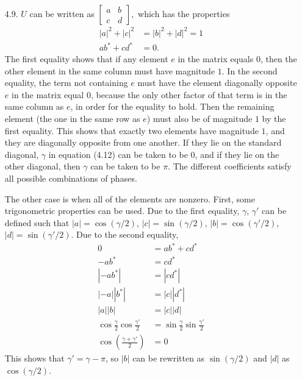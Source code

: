 \documentclass[a4paper,12pt]{article}
\begin{document}
\begin{enumerate}
    \item[4.9.] $U$ can be written as
        $\left[ \begin{array}{cc}
                a & b \\
                c & d
        \end{array} \right],$
        which has the properties
        \begin{align*}
            |a|^2 + |c|^2 &= |b|^2 + |d|^2 = 1 \\
            ab^* + cd^* &= 0.
        \end{align*}
        The first equality shows that if any element $e$ in the matrix equals $0$, then the other element in the same column must have magnitude $1$. In the second equality, the term not containing $e$ must have the element diagonally opposite $e$ in the matrix equal $0$, because the only other factor of that term is in the same column as $e$, in order for the equality to hold. Then the remaining element (the one in the same row as $e$) must also be of magnitude $1$ by the first equality. This shows that exactly two elements have magnitude $1$, and they are diagonally opposite from one another. If they lie on the standard diagonal, $\gamma$ in equation (4.12) can be taken to be $0$, and if they lie on the other diagonal, then $\gamma$ can be taken to be $\pi$. The different coefficients satisfy all possible combinations of phases. \par
        The other case is when all of the elements are nonzero. First, some trigonometric properties can be used. Due to the first equality, $\gamma$, $\gamma'$ can be defined such that $|a| = \cos(\gamma / 2)$, $|c| = \sin(\gamma / 2)$, $|b| = \cos(\gamma' / 2)$, $|d| = \sin(\gamma' / 2)$. Due to the second equality,
        \begin{align*}
            0 &= ab^* + cd^* \\
            -ab^* &= cd^* \\
            |{-ab}^*| &= |cd^*| \\
            |{-a}||b^*| &= |c||d^*| \\
            |a||b| &= |c||d| \\
            \cos\frac{\gamma}{2} \cos\frac{\gamma'}{2} &= \sin\frac{\gamma}{2} \sin\frac{\gamma'}{2} \\
            \cos(\frac{\gamma + \gamma'}{2}) &= 0
        \end{align*}
        This shows that $\gamma' = \gamma - \pi$, so $|b|$ can be rewritten as $\sin(\gamma / 2)$ and $|d|$ as $\cos(\gamma / 2)$. \par

\end{enumerate}
\end{document}
